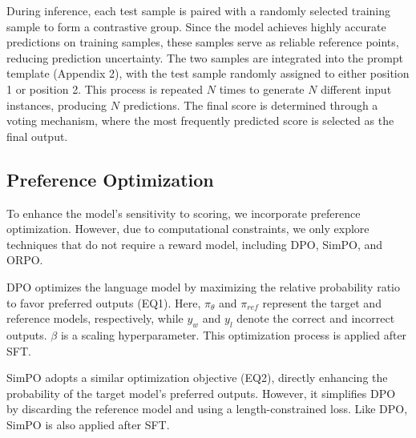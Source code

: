 \documentclass[11pt]{article}
\begin{document}
During inference, each test sample is paired with a randomly selected training sample to form a contrastive group. Since the model achieves highly accurate predictions on training samples, these samples serve as reliable reference points, reducing prediction uncertainty. The two samples are integrated into the prompt template (Appendix 2), with the test sample randomly assigned to either position 1 or position 2. This process is repeated $N$ times to generate $N$ different input instances, producing $N$ predictions. The final score is determined through a voting mechanism, where the most frequently predicted score is selected as the final output.

\subsection{Preference Optimization}


To enhance the model’s sensitivity to scoring, we incorporate preference optimization. However, due to computational constraints, we only explore techniques that do not require a reward model, including DPO, SimPO, and ORPO.


DPO optimizes the language model by maximizing the relative probability ratio to favor preferred outputs (EQ1). Here, $\pi_{\theta}$ and $\pi_{ref}$ represent the target and reference models, respectively, while $y_w$ and $y_l$ denote the correct and incorrect outputs. $\beta$ is a scaling hyperparameter. This optimization process is applied after SFT.


SimPO adopts a similar optimization objective (EQ2), directly enhancing the probability of the target model’s preferred outputs. However, it simplifies DPO by discarding the reference model and using a length-constrained loss. Like DPO, SimPO is also applied after SFT.
\end{document}
